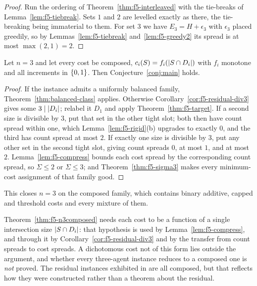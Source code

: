 \begin{proof}
Run the ordering of Theorem~\ref{thm:f5-interleaved} with the tie-breaks of
Lemma~\ref{lem:f5-tiebreak}. Sets $1$ and $2$ are levelled exactly as there, the
tie-breaking being immaterial to them. For set $3$ we have
$E_3 = H + \epsilon_3$ with $\epsilon_3$ placed greedily, so by
Lemmas~\ref{lem:f5-tiebreak} and~\ref{lem:f5-greedy2} its spread is at most
$\max(2,1) = 2$.
\end{proof}

\begin{theorem}
\label{thm:f5-n3composed}
Let $n = 3$ and let every cost be composed,
$c_i(S) = f_i(\left\lvert S \cap D_i\right\rvert)$ with $f_i$ monotone and all increments in
$\left\{0,1\right\}$. Then Conjecture~\ref{conj:main} holds.
\end{theorem}

\begin{proof}
If the instance admits a uniformly balanced family,
Theorem~\ref{thm:balanced-class} applies. Otherwise
Corollary~\ref{cor:f5-residual-div3} gives some $3 \mid \left\lvert D_i\right\rvert$; relabel it
$D_1$ and apply Theorem~\ref{thm:f5-target}. If a second size is divisible by
$3$, put that set in the other tight slot; both then have count spread within
one, which Lemma~\ref{lem:f5-rigid}(b) upgrades to exactly $0$, and the third has
count spread at most $2$. If exactly one size is divisible by $3$, put any other
set in the second tight slot, giving count spreads $0$, at most $1$, and at most
$2$. Lemma~\ref{lem:f5-compress} bounds each cost spread by the corresponding
count spread, so $\Sigma \le 2$ or $\Sigma \le 3$; and
Theorem~\ref{thm:f5-sigma3} makes every minimum-cost assignment of that family
good.
\end{proof}

This closes $n = 3$ on the composed family, which contains binary additive,
capped and threshold costs and every mixture of them.

\begin{remark}
\label{rem:f5-notclosed}
Theorem~\ref{thm:f5-n3composed} needs each cost to be a function of a single
intersection size $\left\lvert S \cap D_i\right\rvert$: that hypothesis is used by
Lemma~\ref{lem:f5-compress}, and through it by
Corollary~\ref{cor:f5-residual-div3} and by the transfer from count spreads to
cost spreads. A dichotomous cost not of this form lies outside the argument, and
whether every three-agent instance reduces to a composed one is \emph{not}
proved. The residual instances exhibited in  are all composed,
but that reflects how they were constructed rather than a theorem about the
residual.
\end{remark}

